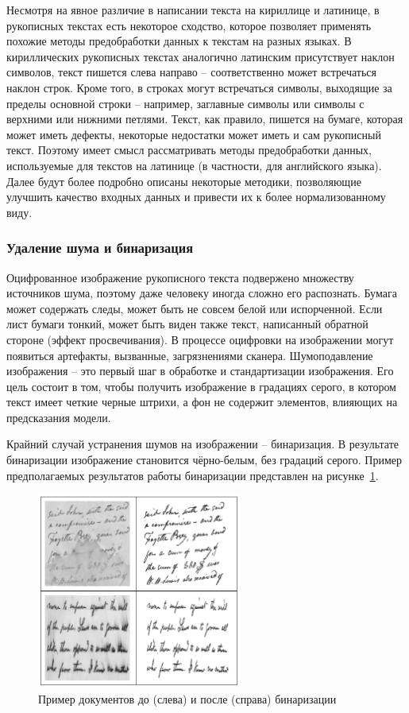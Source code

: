 Несмотря на явное различие в написании текста на кириллице и латинице, в рукописных текстах есть некоторое сходство,
которое позволяет применять похожие методы предобработки данных к текстам на разных языках.
В кириллических рукописных текстах аналогично латинским присутствует наклон символов,
текст пишется слева направо -- соответственно может встречаться наклон строк.
Кроме того, в строках могут встречаться символы, выходящие за пределы основной строки --
например, заглавные символы или символы с верхними или нижними петлями.
Текст, как правило, пишется на бумаге, которая может иметь дефекты, некоторые недостатки может иметь и сам рукописный текст.
Поэтому имеет смысл рассматривать методы предобработки данных, используемые для текстов на латинице (в частности, для английского языка).
Далее будут более подробно описаны некоторые методики, позволяющие улучшить качество входных данных и привести их к более нормализованному виду.

\subsubsection{Удаление шума и бинаризация}
\label{subsubsec:binarization}

Оцифрованное изображение рукописного текста подвержено множеству источников шума, поэтому даже человеку иногда сложно его распознать.
Бумага может содержать следы, может быть не совсем белой или испорченной.
Если лист бумаги тонкий, может быть виден также текст, написанный обратной стороне (эффект просвечивания).
В процессе оцифровки на изображении могут появиться артефакты, вызванные, загрязнениями сканера.
Шумоподавление изображения -- это первый шаг в обработке и стандартизации изображения.
Его цель состоит в том, чтобы получить изображение в градациях серого, в котором текст имеет четкие черные штрихи,
а фон не содержит элементов, влияющих на предсказания модели.

Крайний случай устранения шумов на изображении -- бинаризация.
В результате бинаризации изображение становится чёрно-белым, без градаций серого.
Пример предполагаемых результатов работы бинаризации представлен на рисунке~\ref{fig:binarization}.
\begin{figure}[h!]
    \centering
    \includegraphics[width=0.6\textwidth]{img/binarization}
    \caption{Пример документов до (слева) и после (справа) бинаризации}
    \label{fig:binarization}
\end{figure}

